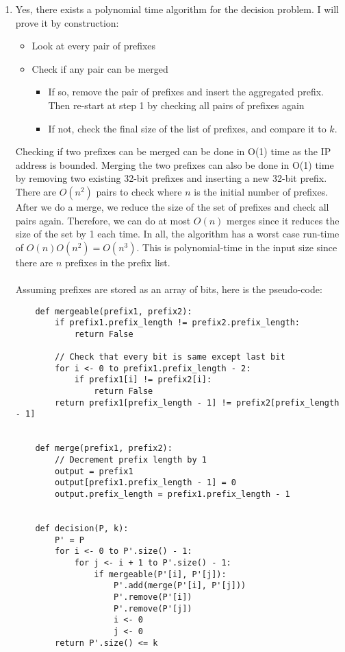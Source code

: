 \documentclass[12pt]{article}
\begin{document}
\begin{enumerate}
    \item Yes, there exists a polynomial time algorithm for the decision problem. I will prove it by construction:
    \begin{itemize}
    \item Look at every pair of prefixes
    \item Check if any pair can be merged
    \begin{itemize}
    	\item If so, remove the pair of prefixes and insert the aggregated prefix. Then re-start at step 1 by checking all pairs of prefixes again
    	\item If not, check the final size of the list of prefixes, and compare it to $k$.
    \end{itemize}
    \end{itemize}
    Checking if two prefixes can be merged can be done in O(1) time as the IP address is bounded. Merging the two prefixes can also be done in O(1) time by removing two existing 32-bit prefixes and inserting a new 32-bit prefix. There are $O(n^2)$ pairs to check where $n$ is the initial number of prefixes. After we do a merge, we reduce the size of the set of prefixes and check all pairs again. Therefore, we can do at most $O(n)$ merges since it reduces the size of the set by 1 each time. In all, the algorithm has a worst case run-time of $O(n)O(n^2) = O(n^3)$. This is polynomial-time in the input size since there are $n$ prefixes in the prefix list. \\ \\ Assuming prefixes are stored as an array of bits, here is the pseudo-code: 
    \begin{verbatim}
    def mergeable(prefix1, prefix2):
        if prefix1.prefix_length != prefix2.prefix_length:
            return False
            
        // Check that every bit is same except last bit
        for i <- 0 to prefix1.prefix_length - 2:
            if prefix1[i] != prefix2[i]:
                return False
        return prefix1[prefix_length - 1] != prefix2[prefix_length - 1]

    
    def merge(prefix1, prefix2):
        // Decrement prefix length by 1
        output = prefix1
        output[prefix1.prefix_length - 1] = 0
        output.prefix_length = prefix1.prefix_length - 1    
    
    
    def decision(P, k):
        P' = P
        for i <- 0 to P'.size() - 1:
            for j <- i + 1 to P'.size() - 1:
                if mergeable(P'[i], P'[j]):
                    P'.add(merge(P'[i], P'[j]))
                    P'.remove(P'[i])
                    P'.remove(P'[j])
                    i <- 0
                    j <- 0
        return P'.size() <= k    					
    \end{verbatim}
  

\end{enumerate}
\end{document}
